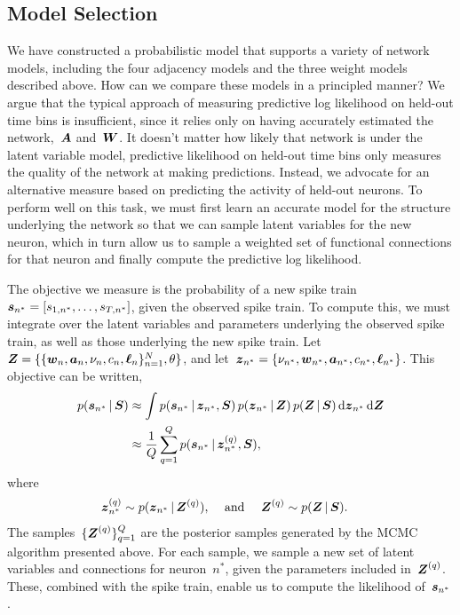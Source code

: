 \subsection{Model Selection}
We have constructed a probabilistic model that supports a variety
of network models, including the four adjacency models and the three
weight models described above. How can we compare these models in
a principled manner? We argue that the typical approach of measuring
predictive log likelihood on held-out time bins is insufficient, since
it relies only on having accurately estimated the network,~$\boldsymbol{A}$ and~$\boldsymbol{W}$.
It doesn't matter how likely that network is under the latent variable
model, predictive likelihood on held-out time bins only measures the
quality of the network at making predictions. Instead, we advocate
for an alternative measure based on predicting the activity of held-out
neurons. To perform well on this task, we must first learn an accurate
model for the structure underlying the network so that we can
sample latent variables for the new neuron, which in turn allow us to
sample a weighted set of functional connections for that neuron and
finally compute the predictive log likelihood.

The objective we measure is the probability of a new spike
train~$\boldsymbol{s}_{n^*}=[s_{1,n^*}, \ldots, s_{T,n^*}]$, given the
observed spike train. To compute this, we must integrate
over the latent variables and parameters underlying the
observed spike train, as well as those underlying the
new spike train. 
Let~$\boldsymbol{Z} = \{\{\boldsymbol{w}_n, \boldsymbol{a}_n, \nu_n, c_n, \boldsymbol{\ell}_n\}_{n=1}^N, \theta\}$, and
let~$\boldsymbol{z}_{n^*} = \{\nu_{n^*}, \boldsymbol{w}_{n^*}, \boldsymbol{a}_{n^*}, c_{n^*}, \boldsymbol{\ell}_{n^*}\}$.
This objective can be written,
\begin{align}
  p(\boldsymbol{s}_{n^*} \,|\, \boldsymbol{S}) &\approx
  \int p(\boldsymbol{s}_{n^*} \,|\, \boldsymbol{z}_{n^*}, \boldsymbol{S}) \, p(\boldsymbol{z}_{n^*} \,|\, \boldsymbol{Z}) \, p(\boldsymbol{Z} \,|\, \boldsymbol{S}) \,
  \mathrm{d} \boldsymbol{z}_{n^*} \, \mathrm{d} \boldsymbol{Z} \\
  &\approx
  \frac{1}{Q} \sum_{q=1}^Q p(\boldsymbol{s}_{n^*} \,|\, \boldsymbol{z}_{n^*}^{(q)}, \boldsymbol{S}),
\end{align}
where
\begin{align}
  \boldsymbol{z}_{n^*}^{(q)} &\sim p(\boldsymbol{z}_{n^*} \,|\, \boldsymbol{Z}^{(q)}),
  &\text{ and }& & 
  \boldsymbol{Z}^{(q)} &\sim p(\boldsymbol{Z} \,|\, \boldsymbol{S}).
\end{align}
The samples~$\{\boldsymbol{Z}^{(q)}\}_{q=1}^Q$ are the posterior samples generated
by the MCMC algorithm presented above. For each sample, we
sample a new set of latent variables and connections for neuron~$n^*$,
given the parameters included in~$\boldsymbol{Z}^{(q)}$. These, combined with
the spike train, enable us to compute the likelihood of~$\boldsymbol{s}_{n^*}$.

